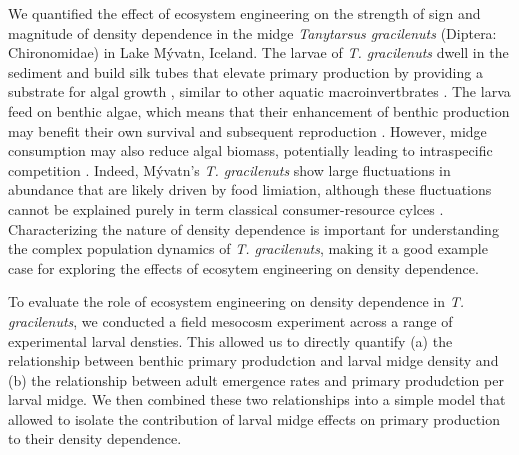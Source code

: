 We quantified the effect of ecosystem engineering on the strength of sign and magnitude
of density dependence in the midge \emph{Tanytarsus gracilenuts} (Diptera: Chironomidae)
in Lake M\'{y}vatn, Iceland. 
The larvae of \emph{T. gracilenuts} dwell in the sediment and build silk tubes that 
elevate primary production by providing a substrate for algal growth 
\citep{herren2017, phillips2019},
similar to other aquatic macroinvertbrates 
\citep{largaespada2012,donadi2014,hoelker2015}.
The larva feed on benthic algae, 
which means that their enhancement of benthic production may benefit their own 
survival and subsequent reproduction \citep{ingvason2004, einarsson2002}.
However, midge consumption may also reduce algal biomass,
potentially leading to intraspecific competition \citep{einarsson2016}.
Indeed, M\'{y}vatn's \emph{T. gracilenuts} show large fluctuations 
in abundance that are likely driven by food limiation,
although these fluctuations cannot be explained purely in term classical 
consumer-resource cylces \citep{ives2008}.
Characterizing the nature of density dependence is important for understanding 
the complex population dynamics of \emph{T. gracilenuts},
making it a good example case for exploring the effects of ecosytem engineering 
on density dependence.

To evaluate the role of ecosystem engineering on density dependence in \emph{T. gracilenuts},
we conducted a field mesocosm experiment across a range of experimental larval densties. 
This allowed us to directly quantify
(a) the relationship between benthic primary produdction and larval midge density and
(b) the relationship between adult emergence rates and primary produdction per larval midge.
We then combined these two relationships into a simple model 
that allowed to isolate the contribution of larval midge effects on 
primary production to their density dependence.


